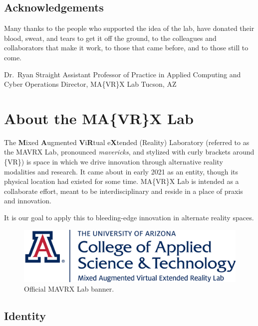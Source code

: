 \documentclass[]{tufte-book}
\begin{document}
\hypertarget{acknowledgements}{%
\section*{Acknowledgements}\label{acknowledgements}}

Many thanks to the people who supported the idea of the lab, have donated their blood, sweat, and tears to get it off the ground, to the colleagues and collaborators that make it work, to those that came before, and to those still to come.

Dr.~Ryan Straight
Assistant Professor of Practice in Applied Computing and Cyber Operations
Director, MA\{VR\}X Lab
Tucson, AZ

\hypertarget{about-the-mavrx-lab}{%
\chapter*{About the MA\{VR\}X Lab}\label{about-the-mavrx-lab}}

The \textbf{M}ixed \textbf{A}ugmented \textbf{V}i\textbf{R}tual e\textbf{X}tended (Reality) Laboratory (referred to as the MAVRX Lab, pronounced \emph{mavericks}, and stylized with curly brackets around \{VR\}) is space in which we drive innovation through alternative reality modalities and research. It came about in early 2021 as an entity, though its physical location had existed for some time. MA\{VR\}X Lab is intended as a collaborate effort, meant to be interdisciplinary and reside in a place of praxis and innovation.

It is our goal to apply this to bleeding-edge innovation in alternate reality spaces.

\begin{figure}
\includegraphics[width=1\linewidth]{images/CAST_Mixed-Augmented-Virtual-Extended-Reality-Lab_SCRIPT_TEMPLATE_2018_PRIMARY} \caption[Official MAVRX Lab banner]{Official MAVRX Lab banner.}\label{fig:banner}
\end{figure}

\hypertarget{identity}{%
\section*{Identity}\label{identity}}
\end{document}
